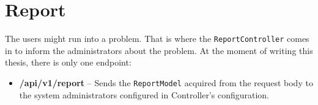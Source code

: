 \section{Report}
The users might run into a problem. That is where the \texttt{ReportController} comes in to inform the administrators about the problem. At the moment of writing this thesis, there is only one endpoint:
\begin{itemize}
    \item \textbf{\text{[POST]} /api/v1/report} -- Sends the \texttt{ReportModel} acquired from the request body to the system administrators configured in Controller's configuration.
\end{itemize}
